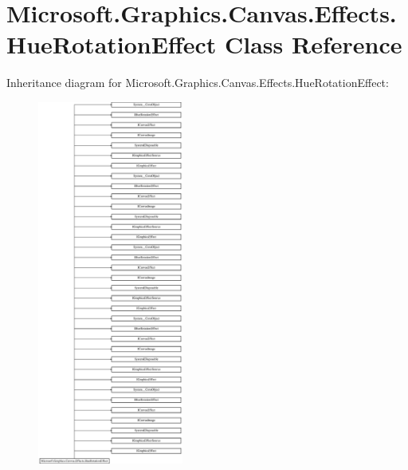 \hypertarget{class_microsoft_1_1_graphics_1_1_canvas_1_1_effects_1_1_hue_rotation_effect}{}\section{Microsoft.\+Graphics.\+Canvas.\+Effects.\+Hue\+Rotation\+Effect Class Reference}
\label{class_microsoft_1_1_graphics_1_1_canvas_1_1_effects_1_1_hue_rotation_effect}
Inheritance diagram for Microsoft.\+Graphics.\+Canvas.\+Effects.\+Hue\+Rotation\+Effect\+:\begin{figure}[H]
\begin{center}
\leavevmode
\includegraphics[height=12.000000cm]{class_microsoft_1_1_graphics_1_1_canvas_1_1_effects_1_1_hue_rotation_effect}
\end{center}
\end{figure}

